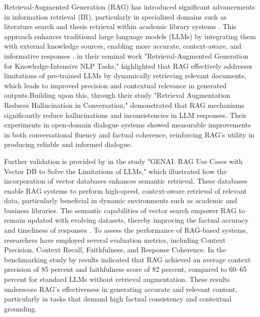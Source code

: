 \begin{refsection}
\hspace{1cm}Retrieval-Augmented Generation (RAG) has introduced significant advancements in information retrieval (IR), particularly in specialized domains such as literature search and thesis retrieval within academic library systems \cite{thomo2024pubmed}. This approach enhances traditional large language models (LLMs) by integrating them with external knowledge sources, enabling more accurate, context-aware, and informative responses \cite{chen2024benchmarking}. \citeauthor{lewis2020retrieval} \citeyear{lewis2020retrieval} in their seminal work "Retrieval-Augmented Generation for Knowledge-Intensive NLP Tasks," highlighted that RAG effectively addresses limitations of pre-trained LLMs by dynamically retrieving relevant documents, which leads to improved precision and contextual relevance in generated outputs.Building upon this, \citeauthor{shuster2021retrieval} \citeyear{shuster2021retrieval} through their study "Retrieval Augmentation Reduces Hallucination in Conversation," demonstrated that RAG mechanisms significantly reduce hallucinations and inconsistencies in LLM responses. Their experiments in open-domain dialogue systems showed measurable improvements in both conversational fluency and factual coherence, reinforcing RAG's utility in producing reliable and informed dialogue.

\hspace{0.4cm}Further validation is provided by \citeauthor{sagi2024genai} \citeyear{sagi2024genai} in the study "GENAI: RAG Use Cases with Vector DB to Solve the Limitations of LLMs," which illustrated how the incorporation of vector databases enhances semantic retrieval. These databases enable RAG systems to perform high-speed, context-aware retrieval of relevant data, particularly beneficial in dynamic environments such as academic and business libraries. The semantic capabilities of vector search empower RAG to remain updated with evolving datasets, thereby improving the factual accuracy and timeliness of responses \cite{sagi2024genai}. To assess the performance of RAG-based systems, researchers have employed several evaluation metrics, including Context Precision, Context Recall, Faithfulness, and Response Coherence. In the benchmarking study by \citeauthor{liu2024information}  \citeyear{liu2024information} results indicated that RAG achieved an average context precision of 85 percent and faithfulness score of 82 percent, compared to 60–65 percent for standard LLMs without retrieval augmentation. These results underscore RAG's effectiveness in generating accurate and relevant content, particularly in tasks that demand high factual consistency and contextual grounding.




\end{refsection}
